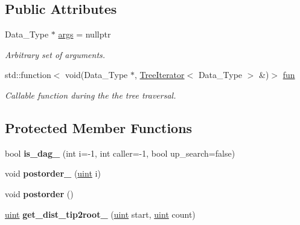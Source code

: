 \subsection*{Public Attributes}
\begin{DoxyCompactItemize}
\item 
\mbox{\label{classpruner_1_1Tree_add57f4e3ee3a539a3f1d95772c607e1b}} 
Data\+\_\+\+Type $\ast$ \hyperlink{classpruner_1_1Tree_add57f4e3ee3a539a3f1d95772c607e1b}{args} = nullptr
\begin{DoxyCompactList}\small\item\em Arbitrary set of arguments. \end{DoxyCompactList}\item 
std\+::function$<$ void(Data\+\_\+\+Type $\ast$, \hyperlink{classpruner_1_1TreeIterator}{Tree\+Iterator}$<$ Data\+\_\+\+Type $>$ \&)$>$ \hyperlink{classpruner_1_1Tree_adc2f509b8bf17ba16364632c17870c87}{fun}
\begin{DoxyCompactList}\small\item\em Callable function during the the tree traversal. \end{DoxyCompactList}\end{DoxyCompactItemize}
\subsection*{Protected Member Functions}
\begin{DoxyCompactItemize}
\item 
\mbox{\label{classpruner_1_1Tree_aa6e923c9b6475afca2763d2594500f02}} 
bool {\bfseries is\+\_\+dag\+\_\+} (int i=-\/1, int caller=-\/1, bool up\+\_\+search=false)
\item 
\mbox{\label{classpruner_1_1Tree_a350ba9e934819f3591522f97af73ee5a}} 
void {\bfseries postorder\+\_\+} (\hyperlink{namespacepruner_a659e6e64a9e2b8e981c3d34262a2f67e}{uint} i)
\item 
\mbox{\label{classpruner_1_1Tree_ab71c8e4ee214eb2fcbeb2d954d79dd62}} 
void {\bfseries postorder} ()
\item 
\mbox{\label{classpruner_1_1Tree_ac6bbe62025b5492cc8c47025e7a6390f}} 
\hyperlink{namespacepruner_a659e6e64a9e2b8e981c3d34262a2f67e}{uint} {\bfseries get\+\_\+dist\+\_\+tip2root\+\_\+} (\hyperlink{namespacepruner_a659e6e64a9e2b8e981c3d34262a2f67e}{uint} start, \hyperlink{namespacepruner_a659e6e64a9e2b8e981c3d34262a2f67e}{uint} count)
\end{DoxyCompactItemize}
